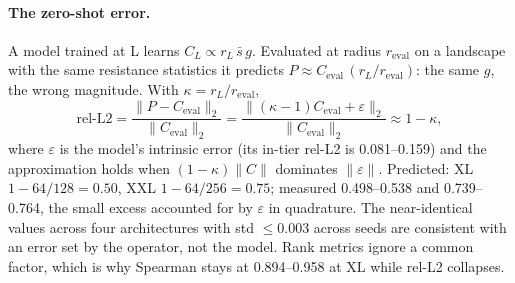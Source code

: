 \documentclass{article}
\newcommand{\relltwo}{rel-L2}
\begin{document}
\paragraph{The zero-shot error.} A model trained at L learns $C_L\propto r_L\,\bar s\, g$. Evaluated at radius $r_{\mathrm{eval}}$ on a landscape with the same resistance statistics it predicts $P\approx C_{\mathrm{eval}}\,(r_L/r_{\mathrm{eval}})$: the same $g$, the wrong magnitude. With $\kappa=r_L/r_{\mathrm{eval}}$,
\[\text{\relltwo{}}=\frac{\|P-C_{\mathrm{eval}}\|_2}{\|C_{\mathrm{eval}}\|_2}=\frac{\|(\kappa-1)C_{\mathrm{eval}}+\varepsilon\|_2}{\|C_{\mathrm{eval}}\|_2}\approx 1-\kappa,\]
where $\varepsilon$ is the model's intrinsic error (its in-tier \relltwo{} is 0.081--0.159) and the approximation holds when $(1-\kappa)\|C\|$ dominates $\|\varepsilon\|$. Predicted: XL $1-64/128=0.50$, XXL $1-64/256=0.75$; measured 0.498--0.538 and 0.739--0.764, the small excess accounted for by $\varepsilon$ in quadrature. The near-identical values across four architectures with std $\le 0.003$ across seeds are consistent with an error set by the operator, not the model. Rank metrics ignore a common factor, which is why Spearman stays at 0.894--0.958 at XL while \relltwo{} collapses.
\end{document}
